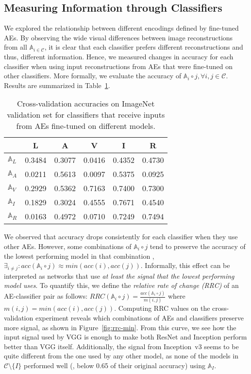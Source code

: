 \documentclass[10pt,twocolumn,a4paper]{article}
\newcommand{\autoe}[1]{\mathbb{A}_{#1}}
\newcommand{\clf}[1]{#1}
\newcommand{\nn}[2]{\autoe{#1}\circ\clf{#2}}
\begin{document}
\subsection{Measuring Information through Classifiers}
\label{sec:crossvalidation}

We explored the relationship between different encodings defined by fine-tuned AEs.
By observing the wide visual differences between image reconstructions from all $\autoe{i \in \mathcal{C}}$, it is clear that each classifier prefers different reconstructions and thus, different information.
Hence, we measured changes in accuracy for each classifier when using input reconstructions from AEs that were fine-tuned on other classifiers.
More formally, we evaluate the accuracy of $\nn{i}{j}, \forall i,j \in \mathcal{C}$.
Results are summarized in Table~\ref{tab:cross-validation}.

\begin{table}
	\caption{Cross-validation accuracies on ImageNet validation set for classifiers that receive inputs from AEs fine-tuned on different models.}
	\label{tab:cross-validation}
	\hspace*{\fill}
	\begin{tabular}[]{lccccc}
		\toprule
		  & L & A & V & I & R \\
		\midrule
		$\mathbb{A}_L$ & 0.3484 & 0.3077 & 0.0416 & 0.4352 & 0.4730 \\
		$\mathbb{A}_A$ & 0.0211 & 0.5613 & 0.0097 & 0.5375 & 0.0925 \\
		$\mathbb{A}_V$ & 0.2929 & 0.5362 & 0.7163 & 0.7400 & 0.7300 \\
		$\mathbb{A}_I$ & 0.1829 & 0.3024 & 0.4555 & 0.7671 & 0.4540 \\
		$\mathbb{A}_R$ & 0.0163 & 0.4972 & 0.0710 & 0.7249 & 0.7494 \\
		\bottomrule
	\end{tabular}
	\hspace*{\fill}
\end{table}

We observed that accuracy drops consistently for each classifier when they use other AEs.
However, some combinations of $\nn{i}{j}$ tend to preserve the accuracy of the lowest performing model in that combination \ie, $\exists_{i\neq j}: acc(\nn{i}{j}) \approx min(acc(i), acc(j))$.
Informally, this effect can be interpreted as networks that use \emph{at least the signal that the lowest performing model uses}.
To quantify this, we define the \emph{relative rate of change (RRC)} of an AE-classifier pair as follows:
$RRC(\nn{i}{j}) = \frac{acc(\nn{i}{j})}{m(i, j)}$ where $m(i, j) = min(acc(i),acc(j))$.
Computing RRC values on the cross-validation experiment reveals which combinations of AEs and classifiers preserve more signal, as shown in Figure~\ref{fig:rrc-min}.
From this curve, we see how the input signal used by VGG is enough to make both ResNet and Inception perform better than VGG itself.
Additionally, the signal from Inception~v3 seems to be quite different from the one used by any other model, as none of the models in $\mathcal{C}\setminus \{I\}$ performed well (\ie, below 0.65 of their original accuracy) using $\autoe{I}$.
\end{document}
